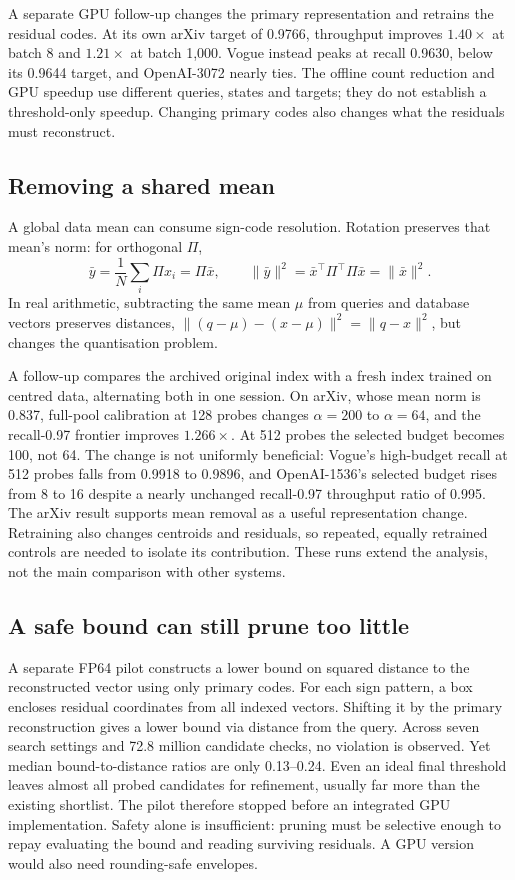 A separate GPU follow-up changes the primary representation and retrains
the residual codes. At its own arXiv target of 0.9766, throughput improves
$1.40\times$ at batch 8 and $1.21\times$ at batch 1,000. Vogue instead
peaks at recall 0.9630, below its 0.9644 target, and OpenAI-3072 nearly
ties. The offline count reduction and GPU speedup use different queries,
states and targets; they do not establish a threshold-only speedup.
Changing primary codes also changes what the residuals must reconstruct.

\subsection{Removing a shared mean}
\label{sec:8-centring}

A global data mean can consume sign-code resolution. Rotation preserves
that mean's norm: for orthogonal $\Pi$,
\[
 \bar y=\frac1N\sum_i\Pi x_i=\Pi\bar x,
 \qquad \|\bar y\|^2=\bar x^\top\Pi^\top\Pi\bar x=\|\bar x\|^2.
\]
In real arithmetic, subtracting the same mean $\mu$ from queries and
database vectors preserves distances,
$\|(q-\mu)-(x-\mu)\|^2=\|q-x\|^2$,
but changes the quantisation problem.

A follow-up compares the archived original index with a fresh index
trained on centred data, alternating both in one session. On arXiv,
whose mean norm is 0.837, full-pool calibration at 128 probes changes
$\alpha=200$ to $\alpha=64$, and the recall-0.97 frontier improves
$1.266\times$. At 512 probes the selected budget becomes 100, not 64.
The change is not uniformly beneficial: Vogue's high-budget recall at
512 probes falls from 0.9918 to 0.9896, and OpenAI-1536's selected budget
rises from 8 to 16 despite a nearly unchanged recall-0.97 throughput
ratio of 0.995. The arXiv result supports mean removal as a useful
representation change. Retraining also changes centroids and residuals,
so repeated, equally retrained controls are needed to isolate its
contribution. These runs extend the analysis, not the main comparison
with other systems.

\subsection{A safe bound can still prune too little}
\label{sec:8-residual-bound}

A separate FP64 pilot constructs a lower bound on squared distance to
the reconstructed vector using only primary codes. For each sign
pattern, a box encloses residual coordinates from all indexed vectors.
Shifting it by the primary reconstruction gives a lower bound via
distance from the query. Across seven search
settings and 72.8 million candidate checks, no violation is observed.
Yet median bound-to-distance ratios are only 0.13--0.24. Even an ideal
final threshold leaves almost all probed candidates for refinement,
usually far more than the existing shortlist. The pilot therefore
stopped before an integrated GPU implementation. Safety alone is
insufficient: pruning must be selective enough to repay evaluating the
bound and reading surviving residuals. A GPU version would also need
rounding-safe envelopes.

